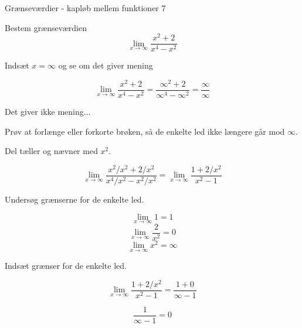 \documentclass{article}
\begin{document}
\begin{exercise}{Grænseværdier - kapløb mellem funktioner 7}
	
	Bestem grænseværdien 
	\[
	\lim_{x \to \infty} \frac{x^2+2}{x^4-x^2}
	\]
	
	
	\hint
	Indsæt $x=\infty$ og se om det giver mening
	
	\hint
	\[
	\lim_{x \to \infty} \frac{x^2+2}{x^4-x^2} = \frac{\infty^2+2}{\infty^4-\infty^2} = \frac{\infty}{\infty}
	\]
	
	\hint
	Det giver ikke mening...
	
	\hint
	Prøv at forlænge eller forkorte brøken, så de enkelte led ikke længere går mod $\infty$. 
	
	\hint
	Del tæller og nævner med $x^2$. 
	
	\hint
	\[
	\lim_{x \to \infty} \frac{x^2/x^2+2/x^2}{x^4/x^2-x^2/x^2} = \lim_{x \to \infty} \frac{1+2/x^2}{x^2-1}
	\]
	
	\hint
	Undersøg grænserne for de enkelte led.
	
	\hint
	\[
	\lim_{x \to \infty} 1 = 1
	\]
	\[
	\lim_{x \to \infty} \frac{2}{x^2} = 0
	\]
	\[
	\lim_{x \to \infty} x^2 = \infty
	\]
	
	\hint 
	Indsæt grænser for de enkelte led.
	
	\hint
	\[
	\lim_{x \to \infty} \frac{1+2/x^2}{x^2-1} = \frac{1+0}{\infty-1} 
	\]
	
	\hint
	\[
 	\frac{1}{\infty-1}  = 0
	\]
	
\end{exercise}
\newpage
\end{document}
